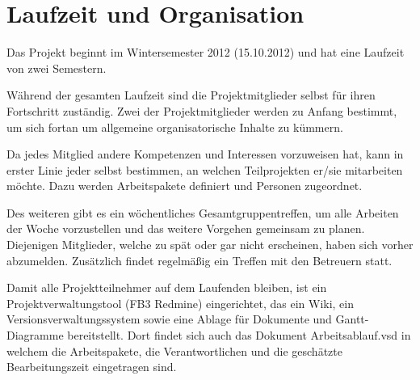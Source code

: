 \section{Laufzeit und Organisation}
\label{LauzeitUndOrganisation} 
Das Projekt beginnt im Wintersemester 2012 (15.10.2012) und hat eine Laufzeit von zwei Semestern.

Während der gesamten Laufzeit sind die Projektmitglieder selbst für ihren Fortschritt zuständig. Zwei der Projektmitglieder werden zu Anfang bestimmt, um sich fortan um allgemeine organisatorische Inhalte zu kümmern.
   
Da jedes Mitglied andere Kompetenzen und Interessen vorzuweisen hat, kann in erster Linie jeder selbst bestimmen, an welchen Teilprojekten er/sie mitarbeiten möchte. Dazu werden Arbeitspakete definiert und Personen zugeordnet.
   
Des weiteren gibt es ein wöchentliches Gesamtgruppentreffen, um alle Arbeiten der Woche vorzustellen und das weitere Vorgehen gemeinsam zu planen. Diejenigen Mitglieder, welche zu spät oder gar nicht erscheinen, haben sich vorher abzumelden. Zusätzlich findet regelmäßig ein Treffen mit den Betreuern statt.

Damit alle Projektteilnehmer auf dem Laufenden bleiben, ist ein Projektverwaltungstool (FB3 Redmine) eingerichtet, das ein Wiki, ein Versionsverwaltungssystem sowie eine Ablage für Dokumente und Gantt-Diagramme bereitstellt. Dort findet sich auch das Dokument Arbeitsablauf.vsd in welchem die Arbeitspakete, die Verantwortlichen und die geschätzte Bearbeitungszeit eingetragen sind.
